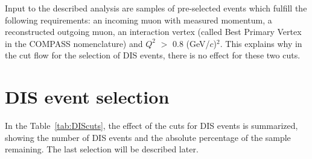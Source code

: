 Input to the described analysis are samples of pre-selected events which fulfill the following requirements: an incoming muon with measured momentum, a reconstructed outgoing muon, an interaction vertex (called Best Primary Vertex in the COMPASS nomenclature) and $Q^2$ $>$ $0.8$ (GeV/$c$)$^2$. This explains why in the cut flow for the selection of DIS events, there is no effect for these two cuts.


\section{DIS event selection}

In the Table~\ref{tab:DIScuts}, the effect of the cuts for DIS events is summarized, showing the number of DIS events and the absolute percentage of the sample remaining. The last selection will be described later.

\newpage

